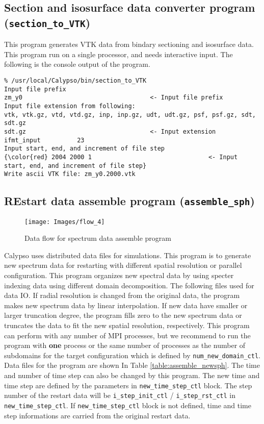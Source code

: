 \subsection{Section and isosurface data converter program ({\tt section\_to\_VTK})} 
\label{section:section_to_VTK}
This program generates VTK data from bindary sectioning and isosurface data. This program run on a single processor, and needs interactive input. The following is the console output of the program.

{\small
\begin{verbatim}
% /usr/local/Calypso/bin/section_to_VTK
Input file prefix
zm_y0									<- Input file prefix
Input file extension from following:
vtk, vtk.gz, vtd, vtd.gz, inp, inp.gz, udt, udt.gz, psf, psf.gz, sdt, sdt.gz  
sdt.gz									<- Input extension
ifmt_input          23
Input start, end, and increment of file step
{\color{red} 2004 2000 1								<- Input start, end, and increment of file step} 
Write ascii VTK file: zm_y0.2000.vtk
\end{verbatim}
}

\subsection{REstart data assemble program ({\tt assemble\_sph})}
\label{section:assemble_sph}
%
\begin{figure}[htbp]
\begin{center}
\texttt{[image: Images/flow\_4]}
\end{center}
\caption{Data flow for spectrum data assemble program}
\label{fig:flow_4}
\end{figure}
%
Calypso uses distributed data files for simulations. This program is to generate new spectrum data for restarting with different spatial resolution or parallel configuration. This program organizes new spectral data by using specter indexing data using different domain decomposition. The following files used for data IO. If radial resolution is changed from the original data, the program makes new spectrum data by linear interpolation. If new data have smaller or larger truncation degree, the program fills zero to the new spectrum data or truncates the data to fit the new spatial resolution, respectively. This program can perform with any number of MPI processes, but we recommend to run the program with {\bf one} process or the same number of processes as the number of subdomains for the target configuration which is defined by \verb|num_new_domain_ctl|. Data files for the program are shown In Table \ref{table:assemble_newsph}. The time and number of time step can also be changed by this program. The new time and time step are defined by the parameters in \verb|new_time_step_ctl| block. The step number of the restart data will be \verb|i_step_init_ctl| / \verb|i_step_rst_ctl| in  \verb|new_time_step_ctl|. If \verb|new_time_step_ctl| block is not defined, time and time step informations are carried from the original restart data.

